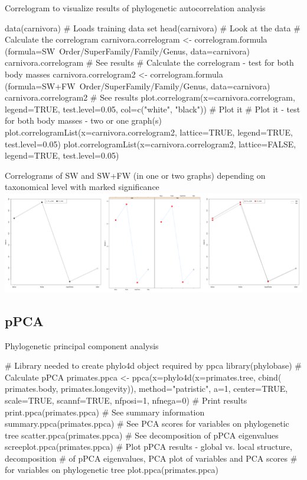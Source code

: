 \documentclass[compress, ucs, xelatex, 11pt, xcolor=svgnames,
  hyperref={
    bookmarks=true,
    unicode=true,
    colorlinks=true,
    pdftitle={Molecular data in R},
    plainpages=false,
    pdfauthor={Vojtech Zeisek},
    pdfsubject={Course about phylogeny and evolution in R},
    pdfcreator={XeLaTeX},
    pdfkeywords={R, evolution, phylogeny, molecular data},
    linkcolor=Tomato,
    anchorcolor=SaddleBrown,
    citecolor=Goldenrod,
    filecolor=DarkMagenta,
    menucolor=Sienna,
    urlcolor=DarkTurquoise,
    pdftex},
  url={hyphens, lowtilde} %
  ]{beamer}
\begin{document}
\begin{frame}[fragile]{Correlogram to visualize results of phylogenetic autocorrelation analysis}
  \begin{spluscode}
    data(carnivora) # Loads training data set
    head(carnivora) # Look at the data
    # Calculate the correlogram
    carnivora.correlogram <- correlogram.formula
      (formula=SW~Order/SuperFamily/Family/Genus, data=carnivora)
    carnivora.correlogram # See results
    # Calculate the correlogram - test for both body masses
    carnivora.correlogram2 <- correlogram.formula
      (formula=SW+FW~Order/SuperFamily/Family/Genus, data=carnivora)
    carnivora.correlogram2 # See results
    plot.correlogram(x=carnivora.correlogram, legend=TRUE,
      test.level=0.05, col=c("white", "black")) # Plot it
    # Plot it - test for both body masses - two or one graph(s)
    plot.correlogramList(x=carnivora.correlogram2, lattice=TRUE,
      legend=TRUE, test.level=0.05)
    plot.correlogramList(x=carnivora.correlogram2, lattice=FALSE,
      legend=TRUE, test.level=0.05)
  \end{spluscode}
\end{frame}

\begin{frame}{Correlograms of SW and SW+FW (in one or two graphs) depending on taxonomical level with marked significance}
\includegraphics[width=\textwidth]{correlog.png}
\end{frame}

\subsection{pPCA}

\begin{frame}[fragile]{Phylogenetic principal component analysis}
  \begin{spluscode}
    # Library needed to create phylo4d object required by ppca
    library(phylobase)
    # Calculate pPCA
    primates.ppca <- ppca(x=phylo4d(x=primates.tree, cbind(
      primates.body, primates.longevity)), method="patristic",
      a=1, center=TRUE, scale=TRUE, scannf=TRUE, nfposi=1, nfnega=0)
    # Print results
    print.ppca(primates.ppca)
    # See summary information
    summary.ppca(primates.ppca)
    # See PCA scores for variables on phylogenetic tree
    scatter.ppca(primates.ppca)
    # See decomposition of pPCA eigenvalues
    screeplot.ppca(primates.ppca)
    # Plot pPCA results - global vs. local structure, decomposition
    # of pPCA eigenvalues, PCA plot of variables and PCA scores
    # for variables on phylogenetic tree
    plot.ppca(primates.ppca)
  \end{spluscode}
\end{frame}
\end{document}
